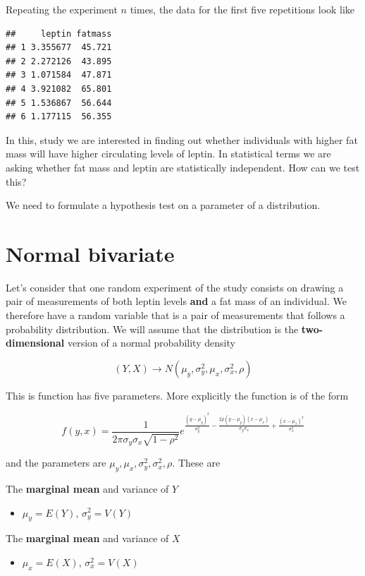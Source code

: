 \documentclass[
]{book}
\providecommand{\tightlist}{%
  \setlength{\itemsep}{0pt}\setlength{\parskip}{0pt}}
\begin{document}
Repeating the experiment \(n\) times, the data for the first five repetitions look like

\begin{verbatim}
##     leptin fatmass
## 1 3.355677  45.721
## 2 2.272126  43.895
## 3 1.071584  47.871
## 4 3.921082  65.801
## 5 1.536867  56.644
## 6 1.177115  56.355
\end{verbatim}

In this, study we are interested in finding out whether individuals with higher fat mass will have higher circulating levels of leptin. In statistical terms we are asking whether fat mass and leptin are statistically independent. How can we test this?

We need to formulate a hypothesis test on a parameter of a distribution.

\hypertarget{normal-bivariate}{%
\section{Normal bivariate}\label{normal-bivariate}}

Let's consider that one random experiment of the study consists on drawing a pair of measurements of both leptin levels \textbf{and} a fat mass of an individual. We therefore have a random variable that is a pair of measurements that follows a probability distribution. We will assume that the distribution is the \textbf{two-dimensional} version of a normal probability density

\[(Y, X) \rightarrow N(\mu_y, \sigma^2_y, \mu_x, \sigma^2_x, \rho)\]

This is function has five parameters. More explicitly the function is of the form

\[f(y,x)=\frac{1}{2\pi \sigma_y\sigma_x \sqrt{1-\rho^2}}e^{\frac{(y-\mu_y)^2}{\sigma_y^2}-\frac{2\rho(y-\mu_y)(x-\mu_x)}{\sigma_y\sigma_x}+\frac{(x-\mu_x)^2}{\sigma_x^2}}\]

and the parameters are \(\mu_y, \mu_x, \sigma^2_y, \sigma_x^2, \rho\). These are

The \textbf{marginal mean} and variance of \(Y\)

\begin{itemize}
\tightlist
\item
  \(\mu_y=E(Y)\), \(\sigma^2_y=V(Y)\)
\end{itemize}

The \textbf{marginal mean} and variance of \(X\)

\begin{itemize}
\tightlist
\item
  \(\mu_x=E(X)\), \(\sigma^2_x=V(X)\)
\end{itemize}
\end{document}
